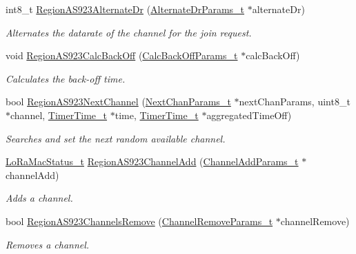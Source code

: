 \begin{DoxyCompactItemize}
int8\+\_\+t \hyperlink{group__REGIONAS923_ga313ff123a69e6a8d72fc958d79150bd5}{Region\+A\+S923\+Alternate\+Dr} (\hyperlink{group__REGION_ga001ea4338d1c83f4c785b49d7ad2d696}{Alternate\+Dr\+Params\+\_\+t} $\ast$alternate\+Dr)
\begin{DoxyCompactList}\small\item\em Alternates the datarate of the channel for the join request. \end{DoxyCompactList}\item 
void \hyperlink{group__REGIONAS923_ga819573966df873dc3e76397d19cfcb34}{Region\+A\+S923\+Calc\+Back\+Off} (\hyperlink{group__REGION_ga7c5c9a8da174e6679eded8257dc92fd9}{Calc\+Back\+Off\+Params\+\_\+t} $\ast$calc\+Back\+Off)
\begin{DoxyCompactList}\small\item\em Calculates the back-\/off time. \end{DoxyCompactList}\item 
bool \hyperlink{group__REGIONAS923_ga5712c1f33958544c25351d4e5ed2015a}{Region\+A\+S923\+Next\+Channel} (\hyperlink{group__REGION_ga115f5e83afae352c0a3dcdc193374040}{Next\+Chan\+Params\+\_\+t} $\ast$next\+Chan\+Params, uint8\+\_\+t $\ast$channel, \hyperlink{utilities_8h_a4215ca43d3e953099ea758ce428599d0}{Timer\+Time\+\_\+t} $\ast$time, \hyperlink{utilities_8h_a4215ca43d3e953099ea758ce428599d0}{Timer\+Time\+\_\+t} $\ast$aggregated\+Time\+Off)
\begin{DoxyCompactList}\small\item\em Searches and set the next random available channel. \end{DoxyCompactList}\item 
\hyperlink{group__LORAMAC_ga30bd25657e10480f8605ee951b0ecfbd}{Lo\+Ra\+Mac\+Status\+\_\+t} \hyperlink{group__REGIONAS923_ga7477b7737c48e88f1d82a7ef70eb7b56}{Region\+A\+S923\+Channel\+Add} (\hyperlink{group__REGION_gab1c5f3aa06614283202906cef4417860}{Channel\+Add\+Params\+\_\+t} $\ast$channel\+Add)
\begin{DoxyCompactList}\small\item\em Adds a channel. \end{DoxyCompactList}\item 
bool \hyperlink{group__REGIONAS923_ga288bc8bbec286314166d13033979678f}{Region\+A\+S923\+Channels\+Remove} (\hyperlink{group__REGION_gaa37468560d2fc81a977b57a48e5d72c0}{Channel\+Remove\+Params\+\_\+t} $\ast$channel\+Remove)
\begin{DoxyCompactList}\small\item\em Removes a channel. \end{DoxyCompactList}\item 

\end{DoxyCompactItemize}
